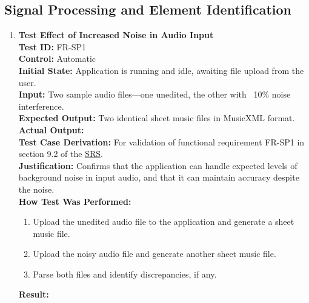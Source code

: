 \documentclass[12pt, titlepage]{article}
\begin{document}
  \subsection{Signal Processing and Element Identification}
  \begin{enumerate}
    \item \textbf{Test Effect of Increased Noise in Audio Input} \\
      \newline
      \textbf{Test ID:} FR-SP1 \\
      \textbf{Control:} Automatic \\
      \textbf{Initial State:} Application is running and idle, awaiting file upload from the user. \\
      \textbf{Input:} Two sample audio files—one unedited, the other with ~10\% noise interference. \\
      \textbf{Expected Output:} Two identical sheet music files in MusicXML format. \\
      \textbf{Actual Output:} \\
      \textbf{Test Case Derivation:} For validation of functional requirement FR-SP1 in section 9.2 of the 
      \href{https://github.com/emilyperica/ScoreGen/blob/main/docs/SRS-Volere/SRS.pdf}{SRS}. \\
      \textbf{Justification:} Confirms that the application can handle expected levels of background noise in input 
      audio, and that it can maintain accuracy despite the noise.\\
      \textbf{How Test Was Performed:}
      \begin{enumerate}
          \item Upload the unedited audio file to the application and generate a sheet music file.
          \item Upload the noisy audio file and generate another sheet music file.
          \item Parse both files and identify discrepancies, if any.
      \end{enumerate}
      \textbf{Result:}
    

\end{enumerate}
\end{document}
